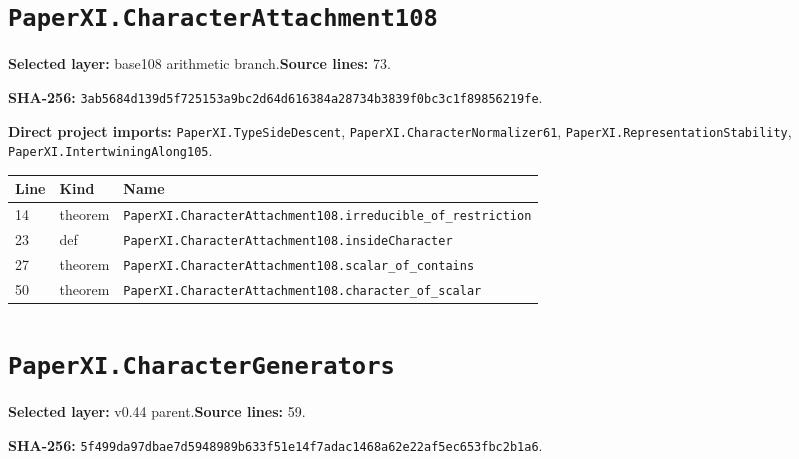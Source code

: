 \documentclass[10pt,oneside]{book}
\begin{document}
\section{\texorpdfstring{\nolinkurl{PaperXI.CharacterAttachment108}}{PaperXI.CharacterAttachment108}}\label{module:PaperXI.CharacterAttachment108}

\textbf{Selected layer:} base108 arithmetic branch.\quad\textbf{Source lines:} 73.\par\textbf{SHA-256:} {\scriptsize\nolinkurl{3ab5684d139d5f725153a9bc2d64d616384a28734b3839f0bc3c1f89856219fe}}.


\textbf{Direct project imports:} \nolinkurl{PaperXI.TypeSideDescent}, \nolinkurl{PaperXI.CharacterNormalizer61}, \nolinkurl{PaperXI.RepresentationStability}, \nolinkurl{PaperXI.IntertwiningAlong105}.

\begin{longtable}{@{}p{}p{}p{}@{}}\toprule Line&Kind&Name\\\midrule\endhead

14&theorem&\nolinkurl{PaperXI.CharacterAttachment108.irreducible_of_restriction}\\

23&def&\nolinkurl{PaperXI.CharacterAttachment108.insideCharacter}\\

27&theorem&\nolinkurl{PaperXI.CharacterAttachment108.scalar_of_contains}\\

50&theorem&\nolinkurl{PaperXI.CharacterAttachment108.character_of_scalar}\\

\bottomrule\end{longtable}

\section{\texorpdfstring{\nolinkurl{PaperXI.CharacterGenerators}}{PaperXI.CharacterGenerators}}\label{module:PaperXI.CharacterGenerators}

\textbf{Selected layer:} v0.44 parent.\quad\textbf{Source lines:} 59.\par\textbf{SHA-256:} {\scriptsize\nolinkurl{5f499da97dbae7d5948989b633f51e14f7adac1468a62e22af5ec653fbc2b1a6}}.

\end{document}
